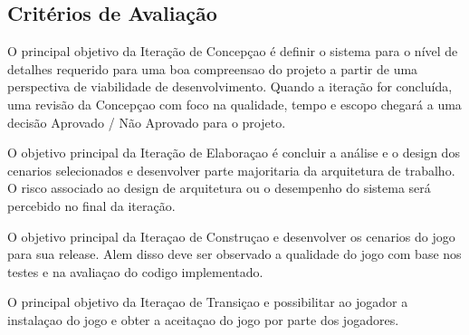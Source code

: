 \subsection{Critérios de Avaliação}

O principal objetivo da Iteração de Concepçao é definir o sistema para o nível de detalhes requerido para uma boa compreensao do projeto a partir de uma perspectiva de viabilidade de desenvolvimento. Quando a iteração for concluída, uma revisão da Concepçao com foco na qualidade, tempo e escopo chegará a uma decisão Aprovado / Não Aprovado para o projeto.

O objetivo principal da Iteração de Elaboraçao é concluir a análise e o design dos cenarios selecionados e desenvolver parte majoritaria da arquitetura de trabalho. O risco associado ao design de arquitetura ou o desempenho do sistema será percebido no final da iteração. 

O objetivo principal da Iteraçao de Construçao e desenvolver os cenarios do jogo para sua release. Alem disso deve ser observado a qualidade do jogo com base nos testes e na avaliaçao do codigo implementado.

O principal objetivo da Iteraçao de Transiçao e possibilitar ao jogador a instalaçao do jogo e obter a aceitaçao do jogo por parte dos jogadores.
